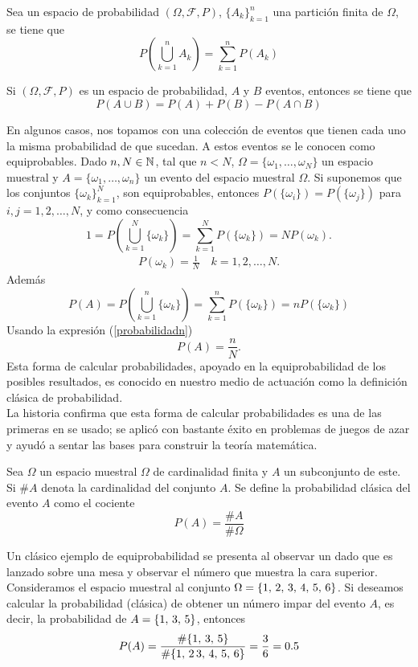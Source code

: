 \begin{Prop}
    Sea un espacio de probabilidad $(\Omega,\mathscr{F},P)$, $\{A_k\}_{k=1}^n$ una partición finita de $\Omega$, se tiene que
    $$P(\bigcup_{k=1}^n A_k)=\sum_{k=1}^n P(A_k)$$ 
\end{Prop}
\begin{Cor}
    Si $(\Omega,\mathscr{F},P)$ es un espacio de probabilidad, $A$ y $B$ eventos, entonces se tiene que
    $$P(A\cup B)=P(A)+P(B)-P(A\cap B)$$
\end{Cor}
En algunos casos, nos topamos con una colección de eventos que tienen cada uno la misma probabilidad de que sucedan. A estos eventos se le conocen como equiprobables.
Dado $n,N\in{\mathbb{N}}$, tal que $n<N$, $\Omega=\{\omega_1,\ldots,\omega_N\}$ un espacio muestral y $A=\{\omega_1,\ldots,\omega_n\}$ un evento del espacio muestral $\Omega$.
Si suponemos que los conjuntos  $\{\omega_k\}_{k=1}^N$, son equiprobables, entonces $P(\{\omega_i\})=P(\{\omega_j\})$ para $i,j=1,2,\ldots,N$, y como consecuencia $$1=P(\bigcup_{k=1}^N \{\omega_k\})=\sum_{k=1}^N P(\{\omega_k\})=N P(\omega_k).$$
\begin{eqnarray}
    \label{probabilidadn}
    P(\omega_k)=\frac{1}{N}\quad k=1,2,\ldots ,N.
\end{eqnarray}
Además
$$P(A)=P(\bigcup_{k=1}^n \{\omega_k\})=\sum_{k=1}^n P(\{\omega_k\})=n P(\{\omega_k\})$$
Usando la expresión (\ref{probabilidadn})
$$P(A)=\frac{n}{N}.$$
Esta forma de calcular probabilidades, apoyado en la equiprobabilidad de los posibles resultados, es conocido en nuestro medio de actuación como la definición clásica de probabilidad.\\
 La historia confirma que esta forma de calcular probabilidades es una de las primeras en se usado; se aplicó con bastante éxito en problemas de juegos de azar y ayudó a sentar las bases para construir la teoría matemática.
\begin{Def}
    Sea $\Omega$ un espacio muestral $\Omega$ de cardinalidad finita y $A$ un subconjunto de este. Si $\#A$ denota la cardinalidad del conjunto $A$. Se define la probabilidad clásica del evento $A$ como el cociente $$P(A)=\frac{\#A}{\#\Omega}$$
    \label{defprobClásica}
\end{Def}
\begin{Ejm}
    Un clásico ejemplo de equiprobabilidad se presenta al observar un dado que es lanzado sobre una mesa y observar el número que muestra la cara superior.\\ Consideramos el espacio muestral al conjunto  $\Omega=\{1,\thinspace 2,\thinspace 3,\thinspace 4,\thinspace 5,\thinspace 6\}$. Si deseamos calcular la probabilidad (clásica) de obtener un número impar del evento $A$, es decir, la probabilidad de $A=\{1,\thinspace 3,\thinspace 5\}$, entonces $$P(A)=\frac{\#\{1,\thinspace 3,\thinspace 5\}}{\#\{1,\thinspace 2\thinspace 3,\thinspace 4,\thinspace 5,\thinspace 6\}}=\frac{3}{6}=0.5$$
\end{Ejm}
